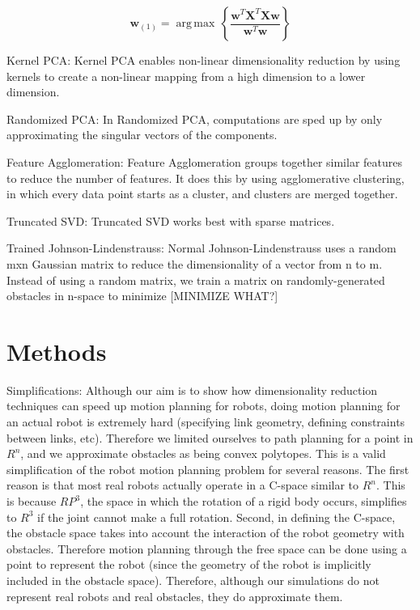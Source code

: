 \documentclass[12pt]{article}
\begin{document}
$$
\mathbf{w}_{(1)} = {\operatorname{\arg\,max}}\, \left\{ \frac{\mathbf{w}^T\mathbf{X}^T \mathbf{X w}}{\mathbf{w}^T \mathbf{w}} \right\}
$$

Kernel PCA: Kernel PCA enables non-linear dimensionality reduction by using kernels to create a non-linear mapping from a high dimension to a lower dimension.

Randomized PCA: In Randomized PCA, computations are sped up by only approximating the singular vectors of the components.

Feature Agglomeration: Feature Agglomeration groups together similar features to reduce the number of features. It does this by using agglomerative clustering, in which every data point starts as a cluster, and clusters are merged together.

Truncated SVD: Truncated SVD works best with sparse matrices.

Trained Johnson-Lindenstrauss: Normal Johnson-Lindenstrauss uses a random mxn Gaussian matrix to reduce the dimensionality of a vector from n to m. Instead of using a random matrix, we train a matrix on randomly-generated obstacles in n-space to minimize [MINIMIZE WHAT?]

\section{Methods}

Simplifications: Although our aim is to show how dimensionality reduction techniques can speed up motion planning for robots, doing motion planning for an actual robot is extremely hard (specifying link geometry, defining constraints between links, etc). Therefore we limited ourselves to path planning for a point in $R^{n}$, and we approximate obstacles as being convex polytopes. This is a valid simplification of the robot motion planning problem for several reasons. The first reason is that most real robots actually operate in a C-space similar to $R^{n}$. This is because $RP^{3}$, the space in which the rotation of a rigid body occurs, simplifies to $R^{3}$ if the joint cannot make a full rotation. Second, in defining the C-space, the obstacle space takes into account the interaction of the robot geometry with obstacles. Therefore motion planning through the free space can be done using a point to represent the robot (since the geometry of the robot is implicitly included in the obstacle space). Therefore, although our simulations do not represent real robots and real obstacles, they do approximate them.
\end{document}
